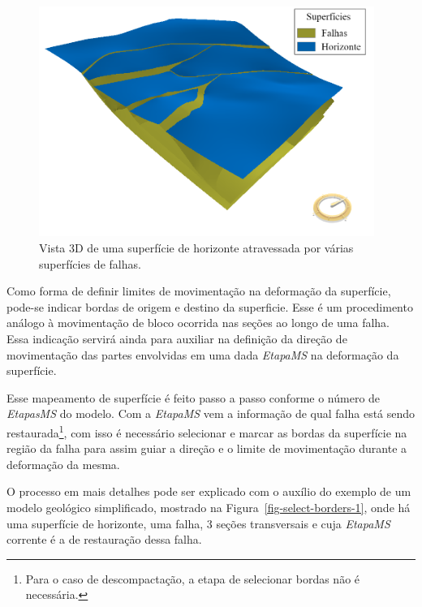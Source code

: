 \begin{figure} [H]
  \begin{center}
    \includegraphics[width=310pt]{images/fig-surfaces-horizon-faults}
    \caption{Vista 3D de uma superfície de horizonte atravessada por várias superfícies de falhas.}\label{fig-surfaces-horizon-faults}
  \end{center}
\end{figure}

Como forma de definir limites de movimentação na deformação da superfície, pode-se indicar bordas de origem e destino da superficie. Esse é um procedimento análogo à movimentação de bloco ocorrida nas seções ao longo de uma falha. Essa indicação servirá ainda para auxiliar na definição da direção de movimentação das partes envolvidas em uma dada \textit{EtapaMS} na deformação da superfície.

Esse mapeamento de superfície é feito passo a passo conforme o número de \textit{EtapasMS} do modelo. Com a \textit{EtapaMS} vem a informação de qual falha está sendo restaurada\footnote{Para o caso de descompactação, a etapa de selecionar bordas não é necessária.}, com isso é necessário selecionar e marcar as bordas da superfície na região da falha para assim guiar a direção e o limite de movimentação durante a deformação da mesma.

O processo em mais detalhes pode ser explicado com o auxílio do exemplo de um modelo geológico simplificado, mostrado na Figura~\ref{fig-select-borders-1}, onde há uma superfície de horizonte, uma falha, 3 seções transversais e cuja \textit{EtapaMS} corrente é a de restauração dessa falha.

